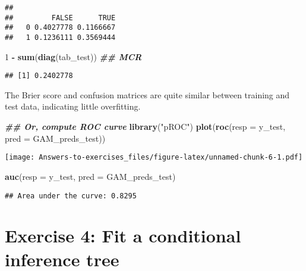 \documentclass[
]{article}
\newenvironment{Shaded}{\begin{snugshade}}{\end{snugshade}}
\newcommand{\AttributeTok}[1]{\textcolor[rgb]{0.13,0.29,0.53}{#1}}
\newcommand{\DecValTok}[1]{\textcolor[rgb]{0.00,0.00,0.81}{#1}}
\newcommand{\DocumentationTok}[1]{\textcolor[rgb]{0.56,0.35,0.01}{\textbf{\textit{#1}}}}
\newcommand{\FunctionTok}[1]{\textcolor[rgb]{0.13,0.29,0.53}{\textbf{#1}}}
\newcommand{\NormalTok}[1]{#1}
\newcommand{\SpecialCharTok}[1]{\textcolor[rgb]{0.81,0.36,0.00}{\textbf{#1}}}
\newcommand{\StringTok}[1]{\textcolor[rgb]{0.31,0.60,0.02}{#1}}
\begin{document}
\begin{verbatim}
##    
##         FALSE      TRUE
##   0 0.4027778 0.1166667
##   1 0.1236111 0.3569444
\end{verbatim}

\begin{Shaded}
\begin{Highlighting}[]
\DecValTok{1} \SpecialCharTok{{-}} \FunctionTok{sum}\NormalTok{(}\FunctionTok{diag}\NormalTok{(tab\_test)) }\DocumentationTok{\#\# MCR}
\end{Highlighting}
\end{Shaded}

\begin{verbatim}
## [1] 0.2402778
\end{verbatim}

The Brier score and confusion matrices are quite similar between
training and test data, indicating little overfitting.

\begin{Shaded}
\begin{Highlighting}[]
\DocumentationTok{\#\# Or, compute ROC curve}
\FunctionTok{library}\NormalTok{(}\StringTok{"pROC"}\NormalTok{)}
\FunctionTok{plot}\NormalTok{(}\FunctionTok{roc}\NormalTok{(}\AttributeTok{resp =}\NormalTok{ y\_test, }\AttributeTok{pred =}\NormalTok{ GAM\_preds\_test))}
\end{Highlighting}
\end{Shaded}

\texttt{[image: Answers-to-exercises\_files/figure-latex/unnamed-chunk-6-1.pdf]}

\begin{Shaded}
\begin{Highlighting}[]
\FunctionTok{auc}\NormalTok{(}\AttributeTok{resp =}\NormalTok{ y\_test, }\AttributeTok{pred =}\NormalTok{ GAM\_preds\_test)}
\end{Highlighting}
\end{Shaded}

\begin{verbatim}
## Area under the curve: 0.8295
\end{verbatim}

\newpage

\hypertarget{exercise-4-fit-a-conditional-inference-tree}{%
\section{Exercise 4: Fit a conditional inference
tree}\label{exercise-4-fit-a-conditional-inference-tree}}
\end{document}
